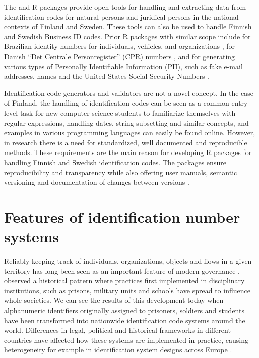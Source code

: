 The  and  R packages provide open tools for handling and extracting data from identification codes for natural persons and juridical persons in the national contexts of Finland and Sweden. These tools can also be used to handle Finnish and Swedish Business ID codes. Prior R packages with similar scope include  for Brazilian identity numbers for individuals, vehicles, and organizations \citep{numbersbr},  for Danish ``Det Centrale Personregister'' (CPR) numbers \citep{cprr}, and  for generating various types of Personally Identifiable Information (PII), such as fake e-mail addresses, names and the United States Social Security Numbers \citep{generator}.

Identification code generators and validators are not a novel concept. In the case of Finland, the handling of identification codes can be seen as a common entry-level task for new computer science students to familiarize themselves with regular expressions, handling dates, string subsetting and similar concepts, and examples in various programming languages can easily be found online. However, in research there is a need for standardized, well documented and reproducible methods. These requirements are the main reason for developing R packages for handling Finnish and Swedish identification codes. The packages ensure reproducibility and transparency while also offering user manuals, semantic versioning and documentation of changes between versions \citep[as outlined by][]{wickham2024}.

\section{Features of identification number systems}\label{features-of-identification-number-systems}

Reliably keeping track of individuals, organizations, objects and flows in a given territory has long been seen as an important feature of modern governance \citep{dodge2005}. \citet[115-120]{foucault7778} observed a historical pattern where practices first implemented in disciplinary institutions, such as prisons, military units and schools have spread to influence whole societies. We can see the results of this development today when alphanumeric identifiers originally assigned to prisoners, soldiers and students have been transformed into nationwide identification code systems around the world. Differences in legal, political and historical frameworks in different countries have affected how these systems are implemented in practice, causing heterogeneity for example in identification system designs across Europe \citep{otjacques2007}.

